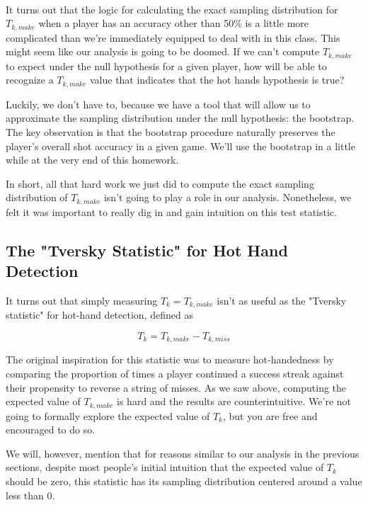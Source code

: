 \documentclass[11pt]{article}
\begin{document}
    \begin{center}
    \end{center}
    { \hspace*{\fill} \\}
    
    It turns out that the logic for calculating the exact sampling
distribution for \(T_{k, make}\) when a player has an accuracy other
than 50\% is a little more complicated than we're immediately equipped
to deal with in this class. This might seem like our analysis is going
to be doomed. If we can't compute \(T_{k, make}\) to expect under the
null hypothesis for a given player, how will be able to recognize a
\(T_{k, make}\) value that indicates that the hot hands hypothesis is
true?

Luckily, we don't have to, because we have a tool that will allow us to
approximate the sampling distribution under the null hypothesis: the
bootstrap. The key observation is that the bootstrap procedure naturally
preserves the player's overall shot accuracy in a given game. We'll use
the bootstrap in a little while at the very end of this homework.

In short, all that hard work we just did to compute the exact sampling
distribution of \(T_{k, make}\) isn't going to play a role in our
analysis. Nonetheless, we felt it was important to really dig in and
gain intuition on this test statistic.

\subsection{The "Tversky Statistic" for Hot Hand
Detection}\label{the-tversky-statistic-for-hot-hand-detection}

It turns out that simply measuring \(T_k = T_{k, make}\) isn't as useful
as the "Tversky statistic" for hot-hand detection, defined as

\[T_k = T_{k, make} - T_{k, miss}\]

The original inspiration for this statistic was to measure
hot-handedness by comparing the proportion of times a player continued a
success streak against their propensity to reverse a string of misses.
As we saw above, computing the expected value of \(T_{k, make}\) is hard
and the results are counterintuitive. We're not going to formally
explore the expected value of \(T_k\), but you are free and encouraged
to do so.

We will, however, mention that for reasons similar to our analysis in
the previous sections, despite most people's initial intuition that the
expected value of \(T_k\) should be zero, this statistic has its
sampling distribution centered around a value less than 0.
\end{document}
